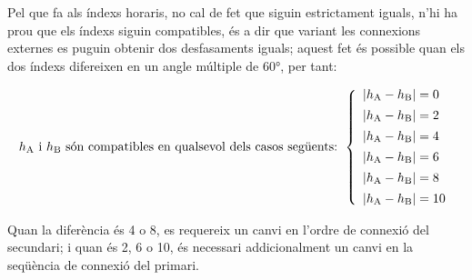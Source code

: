 Pel que fa als índexs horaris, no cal de fet que siguin estrictament iguals, n'hi ha prou  que els índexs siguin compatibles, és a dir que variant les connexions externes es puguin obtenir dos desfasaments iguals; aquest fet és possible quan els dos índexs difereixen en un angle múltiple de \ang{60}, per tant:

\begin{equation}
    h_\mathrm{A} \text{ i } h_\mathrm{B} \text{ són compatibles en qualsevol dels casos següents: }
    \left\{
        \begin{array}{l}
           |h_\mathrm{A} - h_\mathrm{B}| = 0 \\[1ex]
           |h_\mathrm{A} - h_\mathrm{B}| = 2 \\[1ex]
           |h_\mathrm{A} - h_\mathrm{B}| = 4 \\[1ex]
           |h_\mathrm{A} - h_\mathrm{B}| = 6 \\[1ex]
           |h_\mathrm{A} - h_\mathrm{B}| = 8 \\[1ex]
           |h_\mathrm{A} - h_\mathrm{B}| = 10
        \end{array}
    \right.
    \label{eq:index_comp}
\end{equation}

Quan la diferència és 4 o 8, es requereix un canvi en l'ordre de connexió del secundari; i quan és 2, 6 o 10, és necessari addicionalment un canvi en la seqüència de connexió del primari.
	
